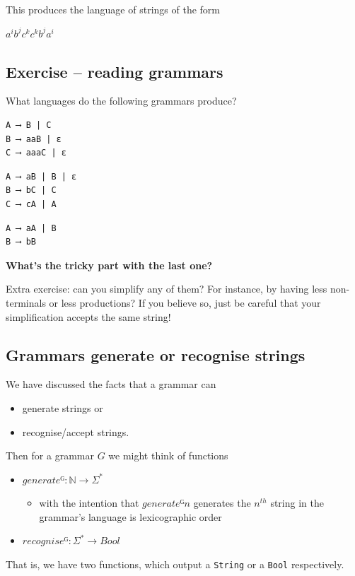 \documentclass[11pt]{article}
\theoremstyle{definition}
\begin{document}
This produces the language of strings of
the form
\begin{center}
\(a^{i}b^{j}c^{k}c^{k}b^{j}a^{i}\)
\end{center}

\subsection{Exercise – reading grammars}
\label{sec:org0d70bf2}

What languages do the following grammars produce?

\begin{verbatim}
A ⟶ B | C
B ⟶ aaB | ε
C ⟶ aaaC | ε
\end{verbatim}

\begin{verbatim}
A ⟶ aB | B | ε
B ⟶ bC | C
C ⟶ cA | A
\end{verbatim}

\begin{verbatim}
A ⟶ aA | B
B ⟶ bB
\end{verbatim}

\textbf{What's the tricky part with the last one?}

Extra exercise: can you simplify any of them?
For instance, by having less non-terminals or less productions?
If you believe so, just be careful that
your simplification accepts the same string!

\subsection{Grammars generate or recognise strings}
\label{sec:orgd1d269c}

We have discussed the facts that a grammar can
\begin{itemize}
\item generate strings or
\item recognise/accept strings.
\end{itemize}

Then for a grammar \(G\) we might think of functions
\begin{itemize}
\item \(generateᴳ : ℕ → Σ^{*}\)
\begin{itemize}
\item with the intention that \(generateᴳ n\) generates the \(n^{th}\)
string in the grammar's language is lexicographic order
\end{itemize}
\item \(recogniseᴳ : Σ^{*} → Bool\)
\end{itemize}
That is, we have two functions, which output a \texttt{String} or
a \texttt{Bool} respectively.
\end{document}
